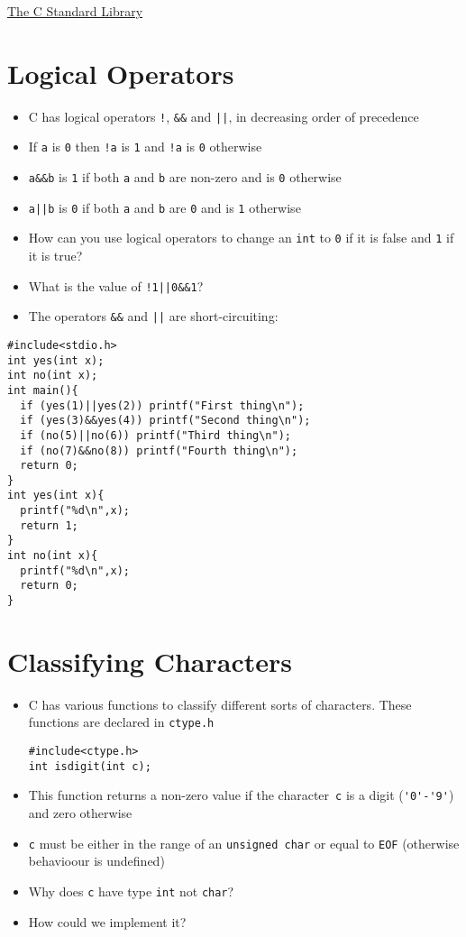 \documentclass{article}
\begin{document}
\begin{center}
	\underline{\huge The C Standard Library}
\end{center}



\section{Logical Operators}
\begin{itemize}
\item C has logical operators \verb~!~, \verb!&&! and \verb!||!, in decreasing order of precedence
\item If \verb!a! is \verb!0! then \verb~!a~ is \verb!1! and \verb~!a~ is \verb~0~ otherwise
\item \verb!a&&b! is \verb~1~ if both \verb!a! and \verb!b! are non-zero and is \verb!0! otherwise
\item \verb!a||b! is \verb!0! if both \verb!a! and \verb!b! are \verb!0! and is \verb!1! otherwise
\item How can you use logical operators to change an \verb!int! to \verb!0! if it is false and \verb!1! if it is true?
\item What is the value of \verb~!1||0&&1~?
\item The operators \verb!&&! and \verb!||! are short-circuiting:
\end{itemize}



\begin{verbatim}
#include<stdio.h>
int yes(int x);
int no(int x);
int main(){
  if (yes(1)||yes(2)) printf("First thing\n");
  if (yes(3)&&yes(4)) printf("Second thing\n");
  if (no(5)||no(6)) printf("Third thing\n");
  if (no(7)&&no(8)) printf("Fourth thing\n");
  return 0;
}
int yes(int x){
  printf("%d\n",x);
  return 1;
}
int no(int x){
  printf("%d\n",x);
  return 0;
}
\end{verbatim}



\section{Classifying Characters}
\begin{itemize}
\item C has various functions to classify different sorts of characters. These functions are declared in \verb!ctype.h!
\begin{verbatim}
#include<ctype.h>
int isdigit(int c);
\end{verbatim}
\item This function returns a non-zero value if the character~\verb!c! is a digit (\verb!'0'-'9'!) and zero otherwise
\item \verb!c! must be either in the range of an \verb!unsigned char! or equal to \verb!EOF! (otherwise behavioour is undefined)
\item Why does \verb!c! have type \verb!int! not \verb!char!?
\item How could we implement it?
\end{itemize}
\end{document}
